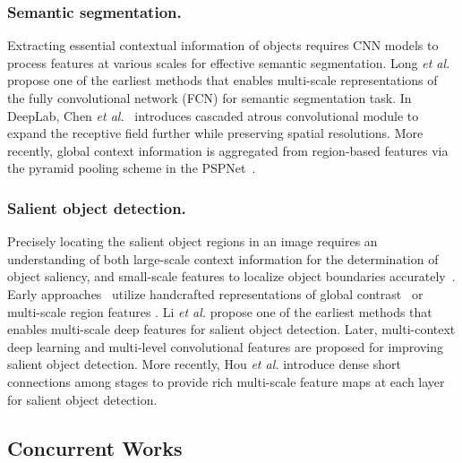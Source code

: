 \documentclass[10pt,journal,cspaper,compsoc]{IEEEtran}
\newcommand{\myPara}[1]{\subsubsection{#1}}
\def\etal{{\em et al.}}
\def\etal{{\em et al.}}
\begin{document}
\myPara{Semantic segmentation.}

Extracting essential contextual information of objects requires CNN models
to process features at various scales for effective semantic segmentation.
%
Long \etal~\cite{long2015fully} propose one of the earliest methods that
enables multi-scale representations of the fully convolutional network (FCN)
for semantic segmentation task.
%
In DeepLab,
Chen \etal~\cite{chen2018deeplab,chen2017rethinking}
introduces cascaded atrous convolutional module to
expand the receptive field further while preserving spatial resolutions.
%
More recently, global context information is aggregated from
region-based features via the pyramid pooling scheme in the
PSPNet~\cite{Zhao2017PSP}.



\myPara{Salient object detection.}

Precisely locating the salient object regions in an image
requires an understanding of both large-scale context information
for the determination of object saliency, 
and small-scale features to localize object boundaries accurately~\cite{zhao2019optimizing}.
%
Early approaches~\cite{borji2015salient} utilize handcrafted
representations of global contrast~\cite{cheng2015global} or
multi-scale region features \cite{WangDRFI2017}.
%
Li \etal \cite{li2015visual} propose one of the earliest methods that
enables multi-scale deep features for salient object detection.
%
Later, multi-context deep learning \cite{zhao2015saliency}
and multi-level convolutional features \cite{zhang2017amulet}
are proposed for improving salient object detection.
%
More recently, Hou \etal \cite{hou2017deeply} introduce dense
short connections among stages to provide rich multi-scale
feature maps at each layer for salient object detection.

\subsection{Concurrent Works} \label{sec:Concurrent_works}
\end{document}
